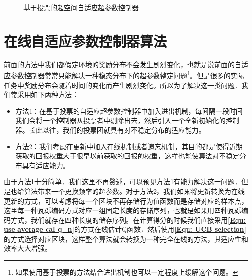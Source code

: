 \begin{figure}[!t]
	\centering
	\caption{基于投票的超空间自适应超参数控制器}
	\label{Fig: vote-based alpha gamma bandit}
\end{figure}


\section{在线自适应参数控制器算法}

前面的方法中我们都假定环境的奖励分布不会发生剧烈变化，也就是说前面的自适应参数控制器常常只能解决一种稳态分布下的超参数整定问题\footnote{如果使用基于投票的方法结合进出机制也可以一定程度上缓解这个问题。}。但是很多的实际任务中奖励分布会随着时间的变化而产生剧烈变化。所以为了解决这一类问题，我们常采用如下两种方法：
\begin{itemize}
    \item 方法1：在基于投票的自适应超参数控制器中加入进出机制，每间隔一段时间我们会将一个控制器从投票者中剔除出去，然后引入一个全新初始化的控制器。长此以往，我们的投票团就具有对不稳定分布的适应能力。
    \item 方法2：我们考虑在更新中加入在线机制或者遗忘机制，其目的都是使得近期获取的回报权重大于很早以前获取的回报的权重，这样也能使算法对不稳定分布具有适应能力。
\end{itemize}

由于方法1十分简单，我们这里不再赘述，可以预见方法1有能力解决这一问题，但是也给算法带来一个更换频率的超参数。对于方法2，我们如果将更新转换为在线更新的方式，可以考虑将每一个区块不再存储行为值函数而是存储对应的样本点，这里每一种瓦砾编码方式对应一组固定长度的存储序列，也就是如果用四种瓦砾编码方式，我们就存在四种长度的储存序列。在计算得分的时候我们直接采用\textbf{\eqref{Equ: use average cal q_n}}的方式在线估计Q函数，然后使用\textbf{\eqref{Equ: UCB selection}}的方式选择对应区块，这样整个算法就会转换为一种完全在线的方法，其适应性和效率大大增强。
